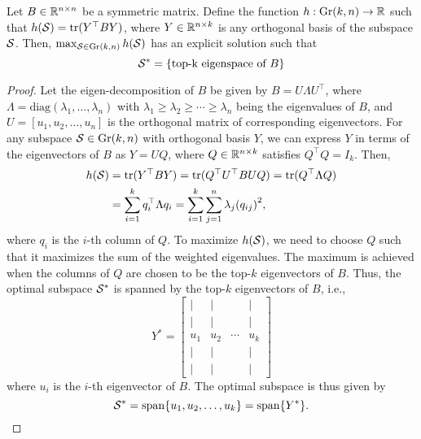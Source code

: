 \begin{lemma}\label{lem:top-k}
    Let $B \in \mathbb{R}^{n \times n}$ be a symmetric matrix. Define the function $h: \text{Gr}(k,n) \to \mathbb{R}$ such that $h(\mathcal{S}) = \mathrm{tr}(Y^\top B Y)$, where $Y \in \mathbb{R}^{n \times k}$ is any orthogonal basis of the subspace $\mathcal{S}$. Then, $\max_{\mathcal{S} \in \text{Gr}(k,n)} h(\mathcal{S})$ has an explicit solution such that 
    \[
        \mathcal{S}^* = \{\textrm{top-k eigenspace of } B\}
    \]
    \begin{proof}
        Let the eigen-decomposition of $B$ be given by $B = U \Lambda U^\top$, where $\Lambda = \mathrm{diag}(\lambda_1, \ldots, \lambda_n)$ with $\lambda_1 \geq \lambda_2 \geq \cdots \geq \lambda_n$ being the eigenvalues of $B$, and $U = [u_1, u_2, \ldots, u_n]$ is the orthogonal matrix of corresponding eigenvectors. For any subspace $\mathcal{S} \in \text{Gr}(k,n)$ with orthogonal basis $Y$, we can express $Y$ in terms of the eigenvectors of $B$ as $Y = U Q$, where $Q \in \mathbb{R}^{n \times k}$ satisfies $Q^\top Q = I_k$. Then,
        \begin{equation*}
        \begin{split}
            h(\mathcal{S}) &= \mathrm{tr}(Y^\top B Y) = \mathrm{tr}(Q^\top U^\top B U Q) = \mathrm{tr}(Q^\top \Lambda Q) \\
            &= \sum_{i=1}^{k} q_i^\top \Lambda q_i = \sum_{i=1}^{k} \sum_{j=1}^{n} \lambda_j {(q_{ij})}^2,
        \end{split}
        \end{equation*}
        where $q_i$ is the $i$-th column of $Q$. To maximize $h(\mathcal{S})$, we need to choose $Q$ such that it maximizes the sum of the weighted eigenvalues. The maximum is achieved when the columns of $Q$ are chosen to be the top-$k$ eigenvectors of $B$. Thus, the optimal subspace $\mathcal{S}^*$ is spanned by the top-$k$ eigenvectors of $B$, i.e., 
        \[
            Y^* = \begin{bmatrix}
            | & | & & | \\
            | & | & & | \\
            u_1 & u_2 & \cdots & u_k \\
            | & | & & | \\
            | & | & & |
            \end{bmatrix}
        \]
        where $u_i$ is the $i$-th eigenvector of $B$. The optimal subspace is thus given by 
        \[
            \mathcal{S}^* = \mathrm{span}\{u_1, u_2, \ldots, u_k\} = \mathrm{span}\{Y^*\}.
        \]
    \end{proof}
\end{lemma}

